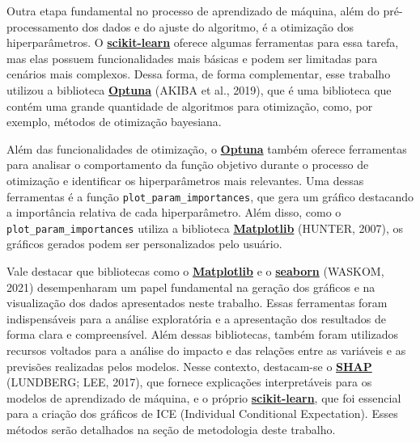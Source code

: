\documentclass[
  12pt,
  a4paper,
]{scrreprt}
\begin{document}
Outra etapa fundamental no processo de aprendizado de máquina, além do
pré-processamento dos dados e do ajuste do algoritmo, é a otimização dos
hiperparâmetros. O
\href{https://scikit-learn.org/stable/}{\textbf{scikit-learn}} oferece
algumas ferramentas para essa tarefa, mas elas possuem funcionalidades
mais básicas e podem ser limitadas para cenários mais complexos. Dessa
forma, de forma complementar, esse trabalho utilizou a biblioteca
\href{https://optuna.org/}{\textbf{Optuna}} (AKIBA et al., 2019), que é
uma biblioteca que contém uma grande quantidade de algoritmos para
otimização, como, por exemplo, métodos de otimização bayesiana.

\vspace{12pt}

Além das funcionalidades de otimização, o
\href{https://optuna.org/}{\textbf{Optuna}} também oferece ferramentas
para analisar o comportamento da função objetivo durante o processo de
otimização e identificar os hiperparâmetros mais relevantes. Uma dessas
ferramentas é a função \texttt{plot\_param\_importances}, que gera um
gráfico destacando a importância relativa de cada hiperparâmetro. Além
disso, como o \texttt{plot\_param\_importances} utiliza a biblioteca
\href{https://matplotlib.org/}{\textbf{Matplotlib}} (HUNTER, 2007), os
gráficos gerados podem ser personalizados pelo usuário.

\vspace{12pt}

Vale destacar que bibliotecas como o
\href{https://matplotlib.org/}{\textbf{Matplotlib}} e o
\href{https://seaborn.pydata.org/}{\textbf{seaborn}} (WASKOM, 2021)
desempenharam um papel fundamental na geração dos gráficos e na
visualização dos dados apresentados neste trabalho. Essas ferramentas
foram indispensáveis para a análise exploratória e a apresentação dos
resultados de forma clara e compreensível. Além dessas bibliotecas,
também foram utilizados recursos voltados para a análise do impacto e
das relações entre as variáveis e as previsões realizadas pelos modelos.
Nesse contexto, destacam-se o
\href{https://shap.readthedocs.io/en/latest}{\textbf{SHAP}} (LUNDBERG;
LEE, 2017), que fornece explicações interpretáveis para os modelos de
aprendizado de máquina, e o próprio
\href{https://scikit-learn.org/stable/}{\textbf{scikit-learn}}, que foi
essencial para a criação dos gráficos de ICE (Individual Conditional
Expectation). Esses métodos serão detalhados na seção de metodologia
deste trabalho.

\vspace{12pt}
\end{document}
